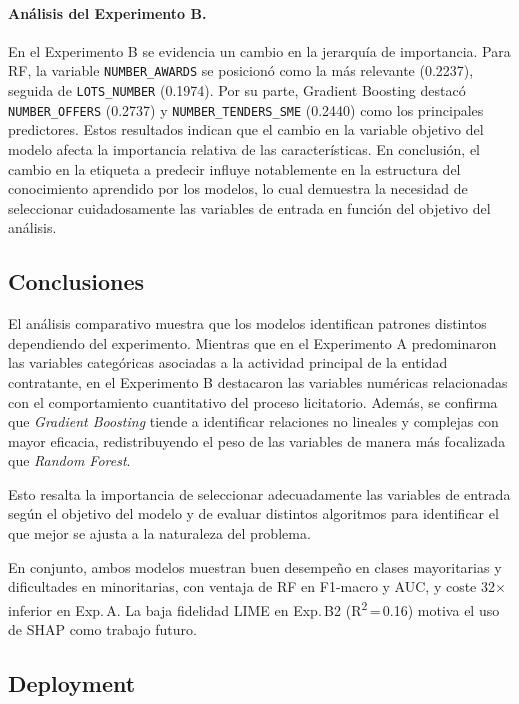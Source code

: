 \documentclass[a4paper,fleqn]{cas-sc}
\begin{document}
\paragraph{\textbf{Análisis del Experimento B.}}
%
En el Experimento B se evidencia un cambio en la jerarqu\'ia de importancia. Para RF, la variable \texttt{NUMBER\_AWARDS} se posicion\'o como la m\'as relevante (0.2237), seguida de \texttt{LOTS\_NUMBER} (0.1974). Por su parte, {Gradient Boosting} destac\'o \texttt{NUMBER\_OFFERS} (0.2737) y \texttt{NUMBER\_TENDERS\_SME} (0.2440) como los principales predictores. Estos resultados indican que el cambio en la variable objetivo del modelo afecta la importancia relativa de las caracter\'isticas.
%
{En conclusi\'on}, el cambio en la etiqueta a predecir influye notablemente en la estructura del conocimiento aprendido por los modelos, lo cual demuestra la necesidad de seleccionar cuidadosamente las variables de entrada en función del objetivo del análisis.

\subsection*{Conclusiones}

El an\'alisis comparativo muestra que los modelos identifican patrones distintos dependiendo del experimento. Mientras que en el Experimento A predominaron las variables categ\'oricas asociadas a la actividad principal de la entidad contratante, en el Experimento B destacaron las variables num\'ericas relacionadas con el comportamiento cuantitativo del proceso licitatorio. Adem\'as, se confirma que \textit{Gradient Boosting} tiende a identificar relaciones no lineales y complejas con mayor eficacia, redistribuyendo el peso de las variables de manera m\'as focalizada que \textit{Random Forest}.

Esto resalta la importancia de seleccionar adecuadamente las variables de entrada seg\'un el objetivo del modelo y de evaluar distintos algoritmos para identificar el que mejor se ajusta a la naturaleza del problema.

	En conjunto, ambos modelos muestran buen desempeño en clases mayoritarias y dificultades en minoritarias, con ventaja de RF en F1-macro y AUC, y coste 32$\times$ inferior en Exp.\,A. La baja fidelidad LIME en Exp.\,B2 (R\textsuperscript{2}\,=\,0.16) motiva el uso de SHAP como trabajo futuro.

	
	
	\subsection{Deployment}\label{sec:fase9}
	
\end{document}

